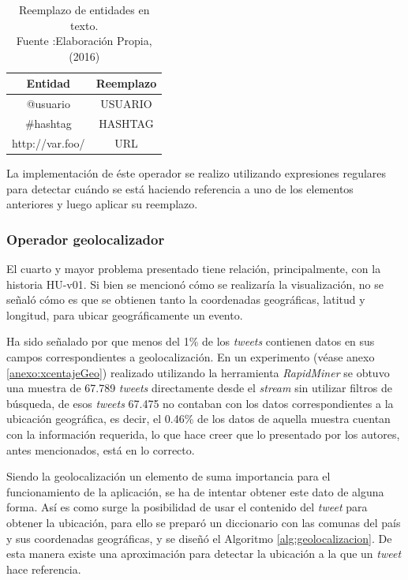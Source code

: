 \begin{table}[H]
\centering
\caption[Reemplazo de entidades en texto.]{Reemplazo de entidades en texto.\\Fuente :Elaboración Propia, (2016)}
\label{tab:reemplazosDeEntidades}
\begin{tabular}{|c|c|}
\hline
\textbf{Entidad} & \textbf{Reemplazo} \\ \hline
@usuario         & USUARIO            \\ \hline
\#hashtag        & HASHTAG            \\ \hline
http://var.foo/  & URL                \\ \hline
\end{tabular}
\end{table}

La implementación de éste operador se realizo utilizando expresiones regulares para detectar cuándo se está haciendo referencia a uno de los elementos anteriores y luego aplicar su reemplazo.

\subsubsection*{Operador geolocalizador}
\label{subsubsec:4op}

El cuarto y mayor problema presentado tiene relación, principalmente, con la historia HU-v01. Si bien se mencionó cómo se realizaría la visualización, no se señaló cómo es que se obtienen tanto la coordenadas geográficas, latitud y longitud, para ubicar geográficamente un evento.

Ha sido señalado por \cite{ChatoSurvey} que menos del 1\% de los \textit{tweets} contienen datos en sus campos correspondientes a geolocalización. En un experimento (véase anexo \ref{anexo:xcentajeGeo}) realizado utilizando la herramienta \textit{RapidMiner} se obtuvo una muestra de 67.789 \textit{tweets} directamente desde el \textit{stream} sin utilizar filtros de búsqueda, de esos \textit{tweets} 67.475 no contaban con los datos correspondientes a la ubicación geográfica, es decir, el 0.46\% de los datos de aquella muestra cuentan con la información requerida, lo que hace creer que lo presentado por los autores, antes mencionados, está en lo correcto.

Siendo la geolocalización un elemento de suma importancia para el funcionamiento de la aplicación, se ha de intentar obtener este dato de alguna forma. Así es como surge la posibilidad de usar el contenido del \textit{tweet} para obtener la ubicación, para ello se preparó un diccionario con las comunas del país y sus coordenadas geográficas, \cite{ubicacionesChile} y se diseñó el Algoritmo \ref{alg:geolocalizacion}. De esta manera existe una aproximación para detectar la ubicación a la que un \textit{tweet} hace referencia.\\

